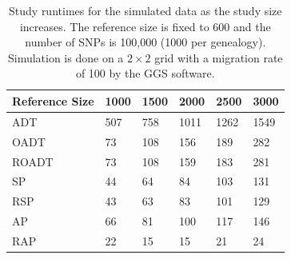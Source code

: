 \documentclass{article}
\begin{document}
\begin{table}
  \centering
  \begin{tabular}{|l|l|l|l|l|l|}
    \hline
    Reference Size & 1000 & 1500 & 2000 & 2500 & 3000 \\
    \hline
    ADT        & 507  & 758 & 1011 & 1262 & 1549 \\
    OADT       &  73  & 108 &  156 &  189 &  282 \\
    ROADT      &  73  & 108 &  159 &  183 &  281 \\
    SP         &  44  &  64 &   84 &  103 &  131 \\
    RSP        &  43  &  63 &   83 &  101 &  129 \\
    AP         &  66  &  81 &  100 &  117 &  146 \\
    RAP        &  22  &  15 &   15 &   21 &   24 \\
    \hline
  \end{tabular}
  \caption{
    Study runtimes for the simulated data as the study size increases.
    The reference size is fixed to 600 and the number of SNPs is 100,000 (1000 per genealogy). 
    Simulation is done on a $2 \times 2$ grid with a migration rate of 100 by the GGS software. 
  }
  \label{tbl:mChg-runtimes-study}
\end{table}
\end{document}
